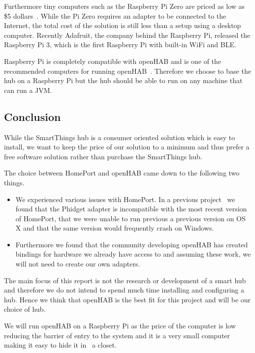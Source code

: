 Furthermore tiny computers such as the Raspberry Pi Zero are priced as low as \$5 dollars~\cite{raspberrypi:zero}. While the Pi Zero requires an adapter to be connected to the Internet, the total cost of the solution is still less than a setup using a desktop computer. Recently Adafruit, the company behind the Raspberry Pi, released the Raspberry Pi 3, which is the first Raspberry Pi with built-in WiFi and BLE.

Raspberry Pi is completely compatible with openHAB and is one of the recommended computers for running openHAB~\cite{openhab:hardware}. Therefore we choose to base the hub on a Raspberry Pi but the hub should be able to run on any machine that can run a JVM.

\subsection{Conclusion}
\label{sec:analysis:choice-of-hub:conclusion}

While the SmartThings hub is a consumer oriented solution which is easy to install, we want to keep the price of our solution to a minimum and thus prefer a free software solution rather than purchase the SmartThings hub.

The choice between HomePort and openHAB came down to the following two things.

\begin{itemize}
\item We experienced various issues with HomePort. In a previous project~\cite{prespecialisation} we found that the Phidget adapter is incompatible with the most recent version of HomePort, that we were unable to run previous a previous version on OS X and that the same version would frequently crash on Windows.
\item Furthermore we found that the community developing openHAB has created bindings for hardware we already have access to and assuming these work, we will not need to create our own adapters.
\end{itemize}

The main focus of this report is not the research or development of a smart hub and therefore we do not intend to spend much time installing and configuring a hub. Hence we think that openHAB is the best fit for this project and will be our choice of hub.

We will run openHAB on a Raspberry Pi as the price of the computer is low reducing the barrier of entry to the system and it is a very small computer making it easy to hide it in \eg~a closet.

